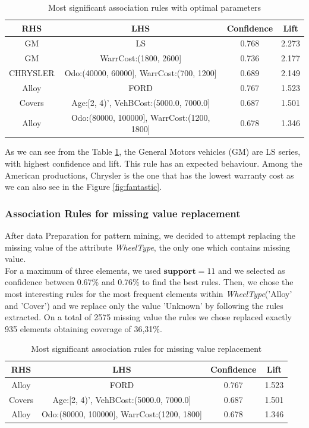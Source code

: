 \documentclass{article}
\begin{document}
	\begin{table}[H]
		\centering
		\begin{tabular}{|cc|cc|}
			\hline
			\textbf{RHS} & \textbf{LHS} & \textbf{Confidence} & \textbf{Lift} \\
			\hline
			\rowcolor{Gray}
			GM & LS & 0.768 & 2.273\\
			GM & WarrCost:(1800, 2600] & 0.736 & 2.177\\
			\rowcolor{Gray}
			CHRYSLER & Odo:(40000, 60000], WarrCost:(700, 1200] & 0.689 & 2.149\\
			Alloy & FORD  & 0.767 & 1.523\\
			\rowcolor{Gray}
			Covers & Age:[2, 4)', VehBCost:(5000.0, 7000.0]  & 0.687 & 1.501 \\
			Alloy &  Odo:(80000, 100000], WarrCost:(1200, 1800] &  0.678 & 1.346 \\
			\hline
		\end{tabular}
		\caption{Most significant association rules with optimal parameters}
		\label{tab:rules}
	\end{table}
	
	As we can see from the Table \ref{tab:rules}, the General Motors vehicles (GM) are LS series, with highest confidence and lift. This rule has an expected behaviour. Among the American productions, Chrysler is the one that has the lowest warranty cost as we can also see in the Figure \ref{fig:fantastic}. 
	
	
	\subsubsection{Association Rules for missing value replacement}
	
	After data Preparation for pattern mining, we decided to attempt replacing the missing value of the attribute \emph{WheelType}, the only one which contains missing value.\\
	For a maximum of three elements, we used $\mathbf{support}= 11$ and we selected as confidence between 0.67\% and  0.76\% to find the best rules.
	Then, we chose the most interesting rules for the most frequent elements within \emph{WheelType}('Alloy' and 'Cover') and we replace only the value 'Unknown' by following the rules extracted. 
	On a total of 2575 missing value the rules we chose replaced exactly 935 elements obtaining coverage of 36,31\%.\\
	
	
	\begin{table}[H]
		\centering
		\begin{tabular}{|cc|cc|}
			\hline
			\textbf{RHS} & \textbf{LHS} & \textbf{Confidence} & \textbf{Lift} \\
			\hline
			\rowcolor{Gray}
			Alloy & FORD  & 0.767 & 1.523\\
			Covers & Age:[2, 4)', VehBCost:(5000.0, 7000.0]  & 0.687 & 1.501 \\
			\rowcolor{Gray}
			Alloy &  Odo:(80000, 100000], WarrCost:(1200, 1800] &  0.678 & 1.346 \\
			\hline
		\end{tabular}
		\caption{Most significant association rules for missing value replacement}
		\label{tab:missingvalrules}
	\end{table}
	
\end{document}
